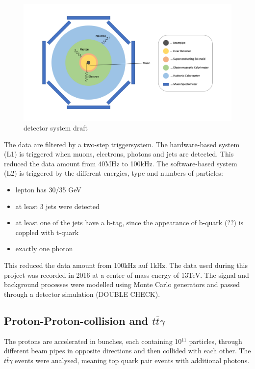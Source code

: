 \documentclass[11pt]{scrartcl}
\begin{document}
	\begin{figure}[H]
	\centering
	\includegraphics[width=1\textwidth]{figures/detector_system.png}
	\caption{detector system draft}
	\label{fig:detectorsystem}
	\end{figure}
	
	The data are filtered by a two-step triggersystem. The hardware-based system (L1) is triggered when muons, electrons, photons and jets are detected. This reduced the data amount from 40MHz to 100kHz. The software-based system (L2) is triggered by the different energies, type and numbers of particles:
	
\begin{itemize}
  \item lepton has 30/35 GeV
  \item at least 3 jets were detected
  \item at least one of the jets have a b-tag, since the appearance of b-quark (??) is coppled with t-quark
  \item exactly one photon
\end{itemize}

This reduced the data amount from 100kHz auf 1kHz. The data used during this project was recorded in 2016 at a centre-of mass energy of 13TeV. The signal and background processes were modelled using Monte Carlo generators and passed through a detector simulation (DOUBLE CHECK). 

	\subsection{Proton-Proton-collision and $t\overline{t}\gamma$}
	The protons are accelerated in bunches, each containing 10$^{11}$ particles, through different beam pipes in opposite directions and then collided with each other. The $t\overline{t}\gamma$ events were analysed, meaning top quark pair events with additional photons.
	
\end{document}

